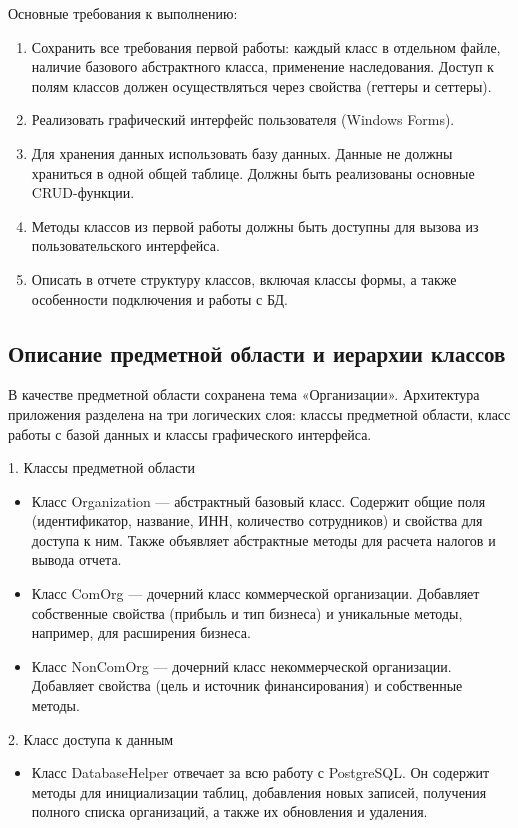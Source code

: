 \documentclass[oneside,a4paper,14pt]{extarticle}
\begin{document}
Основные требования к выполнению:
\begin{enumerate}
	\item Сохранить все требования первой работы: каждый класс в отдельном файле, наличие базового абстрактного класса, применение наследования. Доступ к полям классов должен осуществляться через свойства (геттеры и сеттеры).
	\item Реализовать графический интерфейс пользователя (Windows Forms).
	\item Для хранения данных использовать базу данных. Данные не должны храниться в одной общей таблице. Должны быть реализованы основные CRUD-функции.
	\item Методы классов из первой работы должны быть доступны для вызова из пользовательского интерфейса.
	\item Описать в отчете структуру классов, включая классы формы, а также особенности подключения и работы с БД.
\end{enumerate}

\newpage

\subsection*{Описание предметной области и иерархии классов}

В качестве предметной области сохранена тема «Организации». Архитектура приложения разделена на три логических слоя: классы предметной области, класс работы с базой данных и классы графического интерфейса.

1. Классы предметной области
\begin{itemize}
    \item Класс Organization — абстрактный базовый класс. Содержит общие поля (идентификатор, название, ИНН, количество сотрудников) и свойства для доступа к ним. Также объявляет абстрактные методы для расчета налогов и вывода отчета.
    \item Класс ComOrg — дочерний класс коммерческой организации. Добавляет собственные свойства (прибыль и тип бизнеса) и уникальные методы, например, для расширения бизнеса.
    \item Класс NonComOrg — дочерний класс некоммерческой организации. Добавляет свойства (цель и источник финансирования) и собственные методы.
\end{itemize}

2. Класс доступа к данным
\begin{itemize}
    \item Класс DatabaseHelper отвечает за всю работу с PostgreSQL. Он содержит методы для инициализации таблиц, добавления новых записей, получения полного списка организаций, а также их обновления и удаления.
\end{itemize}
\end{document}
